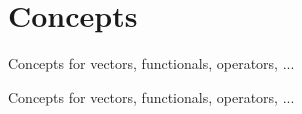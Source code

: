 \hypertarget{group__ConceptGroup}{\section{\-Concepts}
\label{group__ConceptGroup}
}


\-Concepts for vectors, functionals, operators, ...  


\-Concepts for vectors, functionals, operators, ... 
